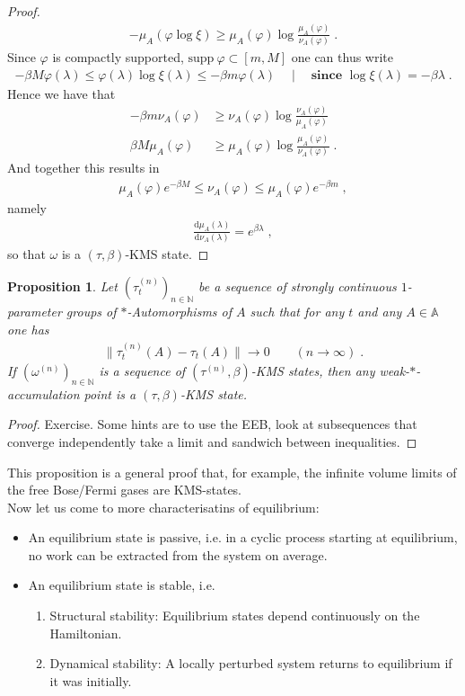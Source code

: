 \documentclass[
a4paper, %
11pt, %
onecolumn, %
openany, %
]{memoir}
\theoremstyle{definition}
\theoremstyle{remark}
\theoremstyle{plain}
\newtheorem{prop}[definition]{Proposition}
\begin{document}
\begin{proof}
\begin{align}
-\mu_A(\varphi\log\xi)\geq \mu_A(\varphi)\log \frac{\mu_A(\varphi)}{\nu_A(\varphi)}\;.
\end{align}
Since $\varphi$ is compactly supported, $\mathrm{supp}~\varphi\subset [m,M]$ one can thus write \begin{align}
-\beta M\varphi(\lambda)\leq \varphi(\lambda)\log\xi(\lambda)\leq -\beta m \varphi(\lambda) \quad \mid \quad \textbf{since }\log\xi(\lambda)=-\beta\lambda\;.
\end{align}
Hence we have that \begin{align}
-\beta m \nu_A(\varphi)&\geq \nu_A(\varphi)\log\frac{\nu_A(\varphi)}{\mu_A(\varphi)}\\
\beta M\mu_A(\varphi)&\geq \mu_A(\varphi)\log\frac{\mu_A(\varphi)}{\nu_A(\varphi)}\; .
\end{align}
And together this results in \begin{align}
\mu_A(\varphi)e^{-\beta M}\leq \nu_A(\varphi)\leq \mu_A(\varphi)e^{-\beta m}\; ,
\end{align}
namely \begin{align}
\frac{\mathrm{d}\mu_A(\lambda)}{\mathrm{d}\nu_A(\lambda)}=e^{\beta\lambda}\; ,
\end{align}
so that $\omega$ is a $(\tau,\beta)$-KMS state.
\end{proof}
\begin{prop}
Let $(\tau_t^{(n)})_{n\in\mathbb{N}}$ be a sequence of strongly continuous $1$-parameter groups of $*$-Automorphisms of $A$ such that for any $t$ and any $A\in\mathbb{A}$ one has \begin{align}
\|\tau_t^{(n)}(A)-\tau_t(A)\|\rightarrow 0 \qquad (n\rightarrow \infty)\; .
\end{align}
If $(\omega^{(n)})_{n\in\mathbb{N}}$ is a sequence of $(\tau^{(n)},\beta)$-KMS states, then any weak-$*$-accumulation point is a $(\tau,\beta)$-KMS state.
\end{prop}
\begin{proof}
Exercise. Some hints are to use the EEB, look at subsequences that converge independently take a limit and sandwich between inequalities. 
\end{proof}
This proposition is a general proof that, for example, the infinite volume limits of the free Bose/Fermi gases are KMS-states.\\
Now let us come to more characterisatins of equilibrium: \begin{itemize}
\item An equilibrium state is passive, i.e. in a cyclic process starting at equilibrium, no work can be extracted from the system on average.
\item An equilibrium state is stable, i.e. \begin{enumerate}
\item Structural stability: Equilibrium states depend continuously on the Hamiltonian.
\item Dynamical stability: A locally perturbed system returns to equilibrium if it was initially.
\end{enumerate}
\end{itemize}
\end{document}
